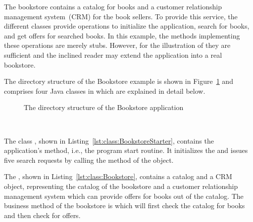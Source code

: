\pagebreak

The bookstore contains a catalog for books and a customer relationship %
management system~(CRM) for the book sellers. To provide this service, the different classes %
provide operations to initialize the application, search for books, and get offers %
for searched books. In this example, the methods implementing these operations are %
merely stubs. However, for the illustration of \Kieker{} they are sufficient and the %
inclined reader may extend the application into a real bookstore. 

The directory structure of the Bookstore example is shown in %
Figure~\ref{fig:PlainBookstoreExample} and comprises four Java classes in %
 which are explained in detail below.

\begin{figure}[H]
\begin{graybox}
\end{graybox}

\caption{The directory structure of the Bookstore application}
\label{fig:PlainBookstoreExample}
\end{figure}


\quad\

\noindent The class , shown in Listing~\ref{lst:class:BookstoreStarter}, %
contains the application's  method, i.e., the program start routine. It initializes the  and issues five search requests by %
calling the  method of the  object.

\setJavaCodeListing



\noindent The , shown in Listing~\ref{lst:class:Bookstore}, contains a catalog and a CRM object, representing the catalog of the bookstore and a customer relationship management system which can provide offers for books out of the catalog. The business method of the bookstore is  which will first check the catalog for books and then check for offers.

